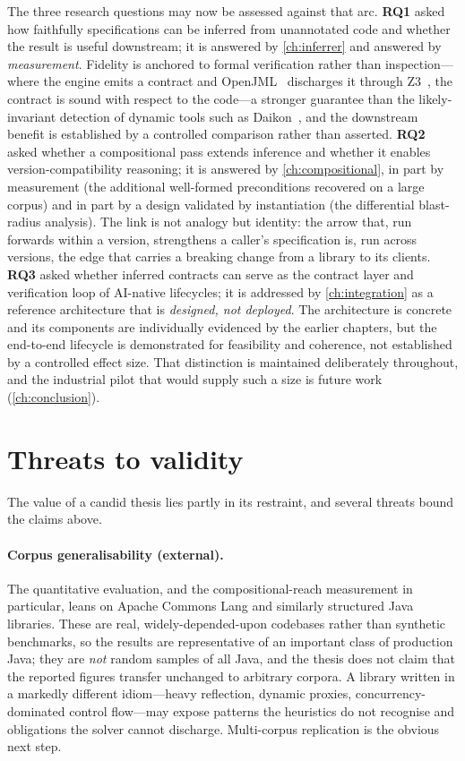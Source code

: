 The three research questions may now be assessed against that arc. \textbf{RQ1}
asked how faithfully specifications can be inferred from unannotated code and
whether the result is useful downstream; it is answered by \cref{ch:inferrer} and
answered by \emph{measurement}. Fidelity is anchored to formal verification rather
than inspection---where the engine emits a contract and OpenJML~\citep{cok2014openjml}
discharges it through Z3~\citep{demoura2008z3}, the contract is sound with respect
to the code---a stronger guarantee than the likely-invariant detection of dynamic
tools such as Daikon~\citep{ernst2007daikon}, and the downstream benefit is
established by a controlled comparison rather than asserted. \textbf{RQ2} asked
whether a compositional pass extends inference and whether it enables
version-compatibility reasoning; it is answered by \cref{ch:compositional}, in part
by measurement (the additional well-formed preconditions recovered on a large
corpus) and in part by a design validated by instantiation (the differential
blast-radius analysis). The link is not analogy but identity: the arrow that, run
forwards within a version, strengthens a caller's specification is, run across
versions, the edge that carries a breaking change from a library to its clients.
\textbf{RQ3} asked whether inferred contracts can serve as the contract layer and
verification loop of AI-native lifecycles; it is addressed by \cref{ch:integration}
as a reference architecture that is \emph{designed, not deployed}. The architecture
is concrete and its components are individually evidenced by the earlier chapters,
but the end-to-end lifecycle is demonstrated for feasibility and coherence, not
established by a controlled effect size. That distinction is maintained
deliberately throughout, and the industrial pilot that would supply such a size is
future work (\cref{ch:conclusion}).

\section{Threats to validity}\label{sec:disc-threats}

The value of a candid thesis lies partly in its restraint, and several threats
bound the claims above.

\paragraph{Corpus generalisability (external).} The quantitative evaluation, and
the compositional-reach measurement in particular, leans on Apache Commons Lang and
similarly structured Java libraries. These are real, widely-depended-upon codebases
rather than synthetic benchmarks, so the results are representative of an important
class of production Java; they are \emph{not} random samples of all Java, and the
thesis does not claim that the reported figures transfer unchanged to arbitrary
corpora. A library written in a markedly different idiom---heavy reflection, dynamic
proxies, concurrency-dominated control flow---may expose patterns the heuristics do
not recognise and obligations the solver cannot discharge. Multi-corpus replication
is the obvious next step.

